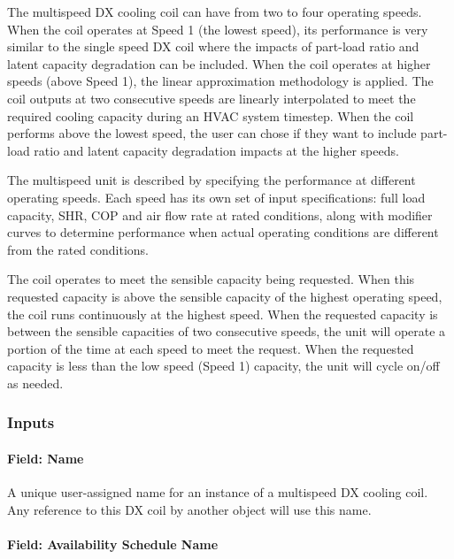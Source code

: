 The multispeed DX cooling coil can have from two to four operating speeds. When the coil operates at Speed 1 (the lowest speed), its performance is very similar to the single speed DX coil where the impacts of part-load ratio and latent capacity degradation can be included. When the coil operates at higher speeds (above Speed 1), the linear approximation methodology is applied. The coil outputs at two consecutive speeds are linearly interpolated to meet the required cooling capacity during an HVAC system timestep. When the coil performs above the lowest speed, the user can chose if they want to include part-load ratio and latent capacity degradation impacts at the higher speeds.

The multispeed unit is described by specifying the performance at different operating speeds. Each speed has its own set of input specifications: full load capacity, SHR, COP and air flow rate at rated conditions, along with modifier curves to determine performance when actual operating conditions are different from the rated conditions.

The coil operates to meet the sensible capacity being requested. When this requested capacity is above the sensible capacity of the highest operating speed, the coil runs continuously at the highest speed. When the requested capacity is between the sensible capacities of two consecutive speeds, the unit will operate a portion of the time at each speed to meet the request. When the requested capacity is less than the low speed (Speed 1) capacity, the unit will cycle on/off as needed.

\subsubsection{Inputs}\label{inputs-16-003}

\paragraph{Field: Name}\label{field-name-15-002}

A unique user-assigned name for an instance of a multispeed DX cooling coil. Any reference to this DX coil by another object will use this name.

\paragraph{Field: Availability Schedule Name}\label{field-availability-schedule-name-9-000}

